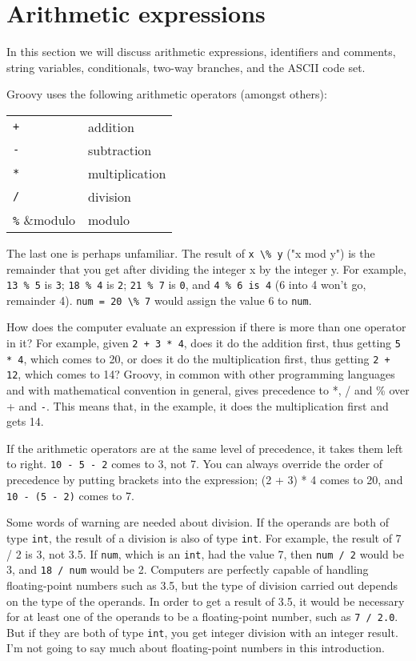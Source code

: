 \section{Arithmetic expressions}

In this section we will discuss arithmetic expressions, identifiers and comments, string variables, conditionals, two-way branches,  and the ASCII code set.

Groovy uses the following arithmetic operators (amongst others):

\begin{tabular}{ll}
\verb!+! & addition\\
\verb!-! &subtraction\\
\verb!*! &multiplication\\
\verb!/! &division\\
\verb!%! &modulo\\
\end{tabular}

The last one is perhaps unfamiliar.  The result of \verb!x \% y! ("x mod y")
is the remainder that you get after dividing the integer x by the integer y.
For example, \verb!13 % 5! is \verb!3!; \verb!18 % 4! is \verb!2!; \verb!21 % 7! is \verb!0!, and \verb!4 % 6 is 4! (6 into
4 won't go, remainder 4).  \verb!num = 20 \% 7! would assign the value 6
to \verb!num!.

How does the computer evaluate an expression if there is more than one
operator in it?  For example, given \verb!2 + 3 * 4!, does it do the addition
first, thus getting \verb!5 * 4!, which comes to 20, or does it do the multiplication
first, thus getting \verb!2 + 12!, which comes to 14?  Groovy, in common with other
programming languages and with mathematical convention in general, gives
precedence to *, / and \% over + and \verb!-!.  This means that, in the example,
it does the multiplication first and gets 14.

If the arithmetic operators are at the same level of precedence, it takes them left
to right.  \verb!10 - 5 - 2! comes to 3, not 7.  You can always override the
order of precedence by putting brackets into the expression; (2 + 3) * 4
comes to 20, and \verb!10 - (5 - 2)! comes to 7.

Some words of warning are needed about division.
If the operands are both of type \verb!int!, the result of a division
is also of type \verb!int!.  For example, the result
of 7 / 2 is 3, not 3.5.  If \verb!num!, which is an \verb!int!, had the value 7,
then \verb!num / 2! would be 3, and \verb!18 / num! would be 2.  Computers
are perfectly capable of handling floating-point numbers such as 3.5, but
the type of division carried out depends on the type of the operands.
In order to get a result of 3.5, it would be necessary for at least one
of the operands to be a floating-point number, such as \verb!7 / 2.0!.  But if
they are both of type \verb!int!, you get integer division with an integer result.  I'm not going to say much about floating-point numbers in
this introduction.

